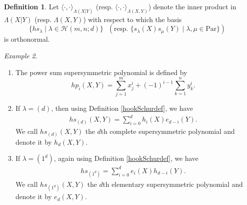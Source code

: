 \documentclass[12pt,reqno]{amsart}
\newtheorem{theorem}{Theorem}[section]
\theoremstyle{definition}
\newtheorem{definition}[theorem]{Definition}
\theoremstyle{remark}
\newtheorem{example}[theorem]{Example}
\newcommand{\Hi}{\mathcal{H}(m,n;d)}
\begin{document}
\begin{definition}
    Let $\langle\cdot,\cdot\rangle_{\Lambda(X|Y)}$ (resp. $\langle\cdot,\cdot\rangle_{\Lambda(X,Y)}$) denote the inner product in $\Lambda(X|Y)$ (resp. $\Lambda(X,Y)$) with respect to which the basis $$\{hs_{\lambda}\mid \lambda\in\Hi\}\text{ } (\text{resp. }\{s_{\lambda}(X)s_{\mu}(Y)\mid\lambda,\mu\in \text{Par}\})$$ is orthonormal.
\end{definition}

\begin{example}
 \begin{enumerate}
    \item The power sum supersymmetric polynomial is defined by
    $$hp_i (X,Y) = \sum_{j=1}^{m}x_{j}^{i}+(-1)^{i-1}\sum_{k=1}^{n}y_{k}^{i}.$$
     \item If $\lambda=(d)$, then using Definition \ref{hookSchurdef}, we have
     \begin{align*}
         hs_{(d)}(X,Y)=\sum_{i=0}^{d}h_{i}(X)e_{d-i}(Y).
     \end{align*}
     We call $hs_{(d)}(X,Y)$ the $d$th complete supersymmetric polynomial and denote it by $h_{d}(X,Y)$. 
     \item If $\lambda=(1^{d})$, again using Definition \ref{hookSchurdef},
     we have
     \begin{align*}
         hs_{(1^{d})}=\sum_{i=0}^{d}e_{i}(X)h_{d-i}(Y).
     \end{align*}
     We call $hs_{(1^{d})}(X,Y)$ the $d$th elementary supersymmetric polynomial and denote it by $e_{d}(X,Y)$. 
 \end{enumerate}
\end{example}
\end{document}
